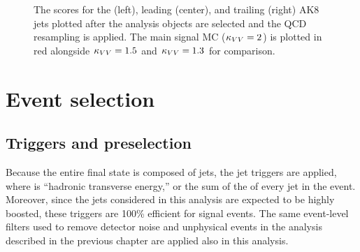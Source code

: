 \begin{figure}[htb]
    \centering
    \caption[The \ParticleNet score distribution for each of the three VBS \VVH AK8 jets plotted in data and MC after QCD resampling]{
        The \ParticleNet scores for the \Htobb (left), leading \Vtoqq (center), and trailing \Vtoqq (right) AK8 jets plotted after the analysis objects are selected and the QCD resampling is applied. 
        The main signal MC ($\kappa_{VV} = 2$) is plotted in red alongside $\kappa_{VV} = 1.5$ and $\kappa_{VV} = 1.3$ for comparison. 
    }
    \label{fig:vbsvvh_dataMC_fatjet_scores}
\end{figure}

\section{Event selection}

\subsection{Triggers and preselection}
Because the entire final state is composed of jets, the jet \HT triggers are applied, where \HT is ``hadronic transverse energy,'' or the sum of the \pt of every jet in the event. 
Moreover, since the jets considered in this analysis are expected to be highly boosted, these triggers are 100\% efficient for signal events. 
The same event-level filters used to remove detector noise and unphysical events in the analysis described in the previous chapter are applied also in this analysis. 

